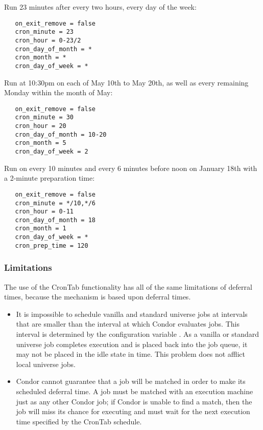Run 23 minutes after every two hours, every day of the week:

\begin{verbatim}
   on_exit_remove = false
   cron_minute = 23
   cron_hour = 0-23/2
   cron_day_of_month = *
   cron_month = *
   cron_day_of_week = *
\end{verbatim}

Run at 10:30pm on each of May 10th to May 20th, as well as every 
remaining Monday within the month of May:

\begin{verbatim}
   on_exit_remove = false
   cron_minute = 30
   cron_hour = 20
   cron_day_of_month = 10-20
   cron_month = 5
   cron_day_of_week = 2
\end{verbatim}

Run on every 10 minutes and every 6 minutes before noon 
on January 18th with a 2-minute preparation time:

\begin{verbatim}
   on_exit_remove = false
   cron_minute = */10,*/6
   cron_hour = 0-11
   cron_day_of_month = 18
   cron_month = 1
   cron_day_of_week = *
   cron_prep_time = 120
\end{verbatim}

\subsubsection{Limitations}
\label{sec:Crontab-Limitations}
The use of the CronTab functionality has all of the same 
limitations of deferral times,
because the mechanism is based upon deferral times.

\begin{itemize}
\item It is impossible to schedule vanilla 
and standard universe jobs 
at intervals that are smaller than the
interval at which Condor evaluates jobs.
This interval is determined by 
the configuration variable . 
As a vanilla or standard universe job completes execution 
and is placed back into the job queue, 
it may not be placed in the idle state in time.
This problem does not afflict local universe jobs.

\item Condor cannot guarantee that a job will be
matched in order to make its scheduled deferral time.
A job must be matched with an execution machine just as
any other Condor job; 
if Condor is unable to find a match, 
then the job will miss its chance for executing
and must wait for the next execution time 
specified by the CronTab schedule.

\end{itemize}
